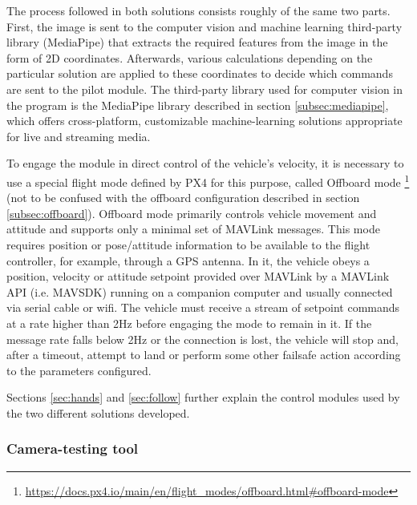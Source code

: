 The process followed in both solutions consists roughly of the same two parts.
First, the image is sent to the computer vision and machine learning third-party library (MediaPipe) that extracts the required features from the image in the form of 2D coordinates.
Afterwards, various calculations depending on the particular solution are applied to these coordinates to decide which commands are sent to the pilot module.
The third-party library used for computer vision in the program is the MediaPipe library described in section \ref{subsec:mediapipe}, which offers cross-platform, customizable machine-learning solutions appropriate for live and streaming media.

To engage the module in direct control of the vehicle's velocity, it is necessary to use a special flight mode defined by PX4 for this purpose, called Offboard mode \footnote{\url{https://docs.px4.io/main/en/flight_modes/offboard.html\#offboard-mode}} (not to be confused with the offboard configuration described in section \ref{subsec:offboard}).
Offboard mode primarily controls vehicle movement and attitude and supports only a minimal set of MAVLink messages.
This mode requires position or pose/attitude information to be available to the flight controller, for example, through a GPS antenna.
In it, the vehicle obeys a position, velocity or attitude setpoint provided over MAVLink by a MAVLink API (i.e. MAVSDK) running on a companion computer and usually connected via serial cable or wifi.
The vehicle must receive a stream of setpoint commands at a rate higher than 2Hz before engaging the mode to remain in it.
If the message rate falls below 2Hz or the connection is lost, the vehicle will stop and, after a timeout, attempt to land or perform some other failsafe action according to the parameters configured.

Sections \ref{sec:hands} and \ref{sec:follow} further explain the control modules used by the two different solutions developed.

\subsubsection{Camera-testing tool}
\label{subsec:cam-tool}

